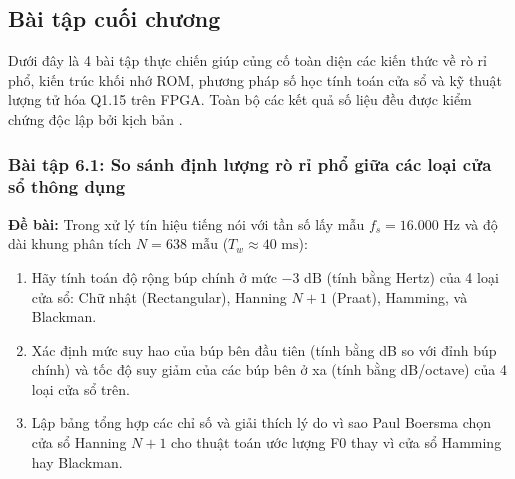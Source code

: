\subsection*{Bài tập cuối chương}

Dưới đây là 4 bài tập thực chiến giúp củng cố toàn diện các kiến thức về rò rỉ phổ, kiến trúc khối nhớ ROM, phương pháp số học tính toán cửa sổ và kỹ thuật lượng tử hóa Q1.15 trên FPGA. Toàn bộ các kết quả số liệu đều được kiểm chứng độc lập bởi kịch bản .

\subsubsection*{Bài tập 6.1: So sánh định lượng rò rỉ phổ giữa các loại cửa sổ thông dụng}
\textbf{Đề bài:} Trong xử lý tín hiệu tiếng nói với tần số lấy mẫu $f_s = 16.000\text{ Hz}$ và độ dài khung phân tích $N = 638\text{ mẫu}$ ($T_w \approx 40\text{ ms}$):
\begin{enumerate}[label=(\alph*)]
    \item Hãy tính toán độ rộng búp chính ở mức $-3\text{ dB}$ (tính bằng Hertz) của 4 loại cửa sổ: Chữ nhật (Rectangular), Hanning $N+1$ (Praat), Hamming, và Blackman.
    \item Xác định mức suy hao của búp bên đầu tiên (tính bằng dB so với đỉnh búp chính) và tốc độ suy giảm của các búp bên ở xa (tính bằng dB/octave) của 4 loại cửa sổ trên.
    \item Lập bảng tổng hợp các chỉ số và giải thích lý do vì sao Paul Boersma chọn cửa sổ Hanning $N+1$ cho thuật toán ước lượng F0 thay vì cửa sổ Hamming hay Blackman.
\end{enumerate}

